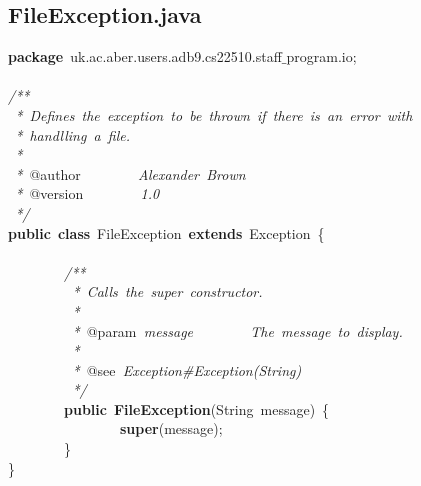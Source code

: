 \normalsize
\rmfamily
\subsection{FileException.java}
\scriptsize
\sffamily
\noindent
\mbox{}\textbf{package}\ uk.ac.aber.users.adb9.cs22510.staff$\_$program.io; \\
\mbox{} \\
\mbox{}\textit{/**} \\
\mbox{}\textit{\ *\ Defines\ the\ exception\ to\ be\ thrown\ if\ there\ is\ an\ error\ with} \\
\mbox{}\textit{\ *\ handlling\ a\ file.} \\
\mbox{}\textit{\ *} \\
\mbox{}\textit{\ *\ }@author\textit{\ \ \ \ \ \ \ \ Alexander\ Brown} \\
\mbox{}\textit{\ *\ }@version\textit{\ \ \ \ \ \ \ \ 1.0} \\
\mbox{}\textit{\ */} \\
\mbox{}\textbf{public}\ \textbf{class}\ FileException\ \textbf{extends}\ Exception\ \{ \\
\mbox{}\ \ \ \ \ \ \ \  \\
\mbox{}\ \ \ \ \ \ \ \ \textit{/**} \\
\mbox{}\textit{\ \ \ \ \ \ \ \ \ *\ Calls\ the\ super\ constructor.} \\
\mbox{}\textit{\ \ \ \ \ \ \ \ \ *} \\
\mbox{}\textit{\ \ \ \ \ \ \ \ \ *\ }@param\textit{\ message\ \ \ \ \ \ \ \ The\ message\ to\ display.} \\
\mbox{}\textit{\ \ \ \ \ \ \ \ \ *} \\
\mbox{}\textit{\ \ \ \ \ \ \ \ \ *\ }@see\textit{\ Exception\#Exception(String)} \\
\mbox{}\textit{\ \ \ \ \ \ \ \ \ */} \\
\mbox{}\ \ \ \ \ \ \ \ \textbf{public}\ \textbf{FileException}(String\ message)\ \{ \\
\mbox{}\ \ \ \ \ \ \ \ \ \ \ \ \ \ \ \ \textbf{super}(message); \\
\mbox{}\ \ \ \ \ \ \ \ \} \\
\mbox{}\} \\

\clearpage
\normalsize
\rmfamily
